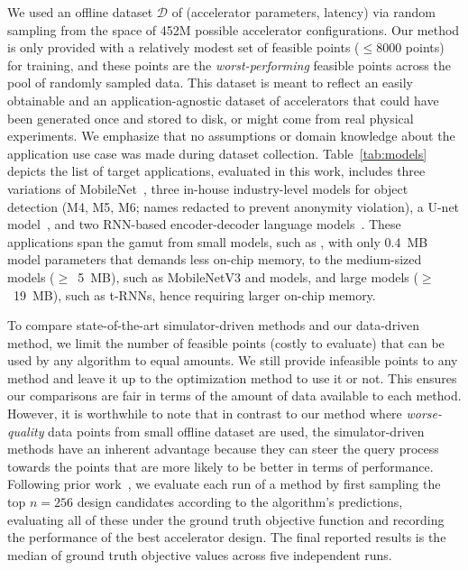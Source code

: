 %
We used an offline dataset $\mathcal{D}$ of (accelerator parameters, latency) via random sampling from the space of 452M possible accelerator configurations.
%
Our method is only provided with a relatively modest set of feasible points ($\leq 8000$ points) for training, and these points are the \emph{worst-performing} feasible points across the pool of randomly sampled data.
%
This dataset is meant to reflect an easily obtainable and an application-agnostic dataset of accelerators that could have been generated once and stored to disk, or might come from real physical experiments. 
%
We emphasize that no assumptions or domain knowledge about the application use case was made during dataset collection.
%
Table~\ref{tab:models} depicts the list of target applications, evaluated in this work, includes three variations of MobileNet~\citep{edgetpu:arxiv:2020,mnv2:arxiv:2018,mnv3:cvpr:2019}, three in-house industry-level models for object detection (M4, M5, M6; names redacted to prevent anonymity violation), a U-net model~\citep{unet}, and two RNN-based encoder-decoder language models~\citep{trnn01,trnn02,trnn03,trnn04}. 
%
These applications span the gamut from small models, such as \msix, with only 0.4~MB model parameters that demands less on-chip memory, to the medium-sized models ($\geq$~5~MB), such as MobileNetV3 and \mfour models, and large models ($\geq$~19~MB), such as t-RNNs, hence requiring larger on-chip memory. 
%


%
To compare state-of-the-art simulator-driven methods and our data-driven method, we limit the number of feasible points (costly to evaluate) that can be used by any algorithm to equal amounts. 
%
We still provide infeasible points to any method and leave it up to the optimization method to use it or not.
% 
This ensures our comparisons are fair in terms of the amount of data available to each method.
%
However, it is worthwhile to note that in contrast to our method where \emph{worse-quality} data points from small offline dataset are used, the simulator-driven methods have an inherent advantage because they can steer the query process towards the points that are more likely to be better in terms of performance.
%
%
Following prior work~\citep{brookes19a,trabucco2021conservative,trabucco2021designbench}, we evaluate each run of a method by first sampling the top $n=256$ design candidates according to the algorithm's predictions, evaluating all of these under the ground truth objective function and recording the performance of the best accelerator design.
%
The final reported results is the median of ground truth objective values across five independent runs.

